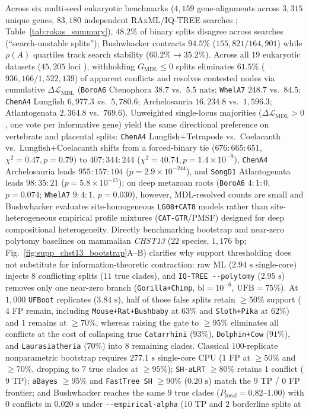 \documentclass[12pt]{article}
\begin{document}
Across six multi-seed eukaryotic benchmarks ($4,159$ gene-alignments across $3,315$ unique genes, $83,180$ independent RAxML/IQ-TREE searches \cite{zhou2018evaluating}; Table~\ref{tab:rokas_summary}), $48.2\%$ of binary splits disagree across searches (``search-unstable splits''); Bushwhacker contracts $94.5\%$ ($155,821 / 164,901$) while $\rho(A)$ quartiles track search stability ($60.2\% \to 35.2\%$). Across all $19$ eukaryotic datasets ($45,205$ loci \cite{shen2017contentious,tarver2016calibration}), withholding $G_{\text{MDL}} \le 0$ splits eliminates $61.5\%$ ($936,166 / 1,522,139$) of apparent conflicts and resolves contested nodes via cumulative $\Delta\mathcal{L}_{\text{MDL}}$ (\texttt{BoroA6} Ctenophora $38.7$ vs.\ $5.5\text{ nats}$; \texttt{WhelA7} $248.7$ vs.\ $84.5$; \texttt{ChenA4} Lungfish $6,977.3$ vs.\ $5,780.6$; Archelosauria $16,234.8$ vs.\ $1,596.3$; Atlantogenata $2,364.8$ vs.\ $769.6$). Unweighted single-locus majorities ($\Delta\mathcal{L}_{\text{MDL}} > 0$, one vote per informative gene) yield the same directional preference on vertebrate and placental splits: \texttt{ChenA4} Lungfish+Tetrapods vs.\ Coelacanth vs.\ Lungfish+Coelacanth shifts from a forced-binary tie ($676:665:651$, $\chi^2 = 0.47, p = 0.79$) to $407:344:244$ ($\chi^2 = 40.74, p = 1.4\times 10^{-9}$), \texttt{ChenA4} Archelosauria leads $955:157:104$ ($p = 2.9\times 10^{-244}$), and \texttt{SongD1} Atlantogenata leads $98:35:21$ ($p = 5.8\times 10^{-15}$); on deep metazoan roots (\texttt{BoroA6} $4:1:0$, $p = 0.074$; \texttt{WhelA7} $9:4:1$, $p = 0.030$), however, MDL-resolved counts are small and Bushwhacker evaluates site-homogeneous \texttt{LG08+CAT8} models rather than site-heterogeneous empirical profile mixtures (\texttt{CAT-GTR}/PMSF) designed for deep compositional heterogeneity. Directly benchmarking bootstrap and near-zero polytomy baselines on mammalian \textit{CHST13} ($22$ species, $1,176\text{ bp}$; Fig.~\ref{fig:supp_chst13_bootstrap}A--B) clarifies why support thresholding does not substitute for information-theoretic contraction: raw ML ($2.94\text{ s}$ single-core) injects $8$ conflicting splits ($11$ true clades), and \texttt{IQ-TREE {-}{-}polytomy} ($2.95\text{ s}$) removes only one near-zero branch (\texttt{Gorilla+Chimp}, $\mathrm{bl}=10^{-6}$, $\mathrm{UFB}=75\%$). At $1,000$ \texttt{UFBoot} replicates ($3.84\text{ s}$), half of those false splits retain $\ge 50\%$ support ($4$ FP remain, including \texttt{Mouse+Rat+Bushbaby} at $63\%$ and \texttt{Sloth+Pika} at $62\%$) and $1$ remains at $\ge 70\%$, whereas raising the gate to $\ge 95\%$ eliminates all conflicts at the cost of collapsing true \texttt{Catarrhini} ($93\%$), \texttt{Dolphin+Cow} ($91\%$), and \texttt{Laurasiatheria} ($70\%$) into $8$ remaining clades. Classical $100$-replicate nonparametric bootstrap requires $277.1\text{ s}$ single-core CPU ($1$ FP at $\ge 50\%$ and $\ge 70\%$, dropping to $7$ true clades at $\ge 95\%$); \texttt{SH-aLRT} $\ge 80\%$ retains $1$ conflict ($9$ TP); \texttt{aBayes} $\ge 95\%$ and \texttt{FastTree SH} $\ge 90\%$ ($0.20\text{ s}$) match the $9$ TP / $0$ FP frontier; and Bushwhacker reaches the same $9$ true clades ($P_{\text{local}} = 0.82\text{--}1.00$) with $0$ conflicts in $0.020\text{ s}$ under \texttt{{-}{-}empirical-alpha} ($10$ TP and $2$ borderline splits at 
\end{document}
